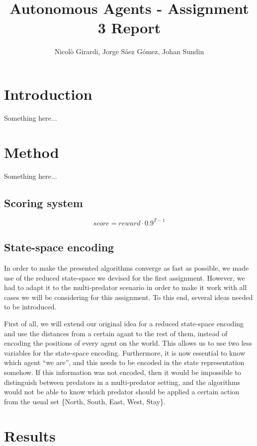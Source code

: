 \documentclass[a4paper,12pt]{article}
\title{Autonomous Agents - Assignment 3 Report}
\author{Nicolò Girardi, Jorge Sáez Gómez, Johan Sundin}
\begin{document}
\maketitle

\section{Introduction}

Something here...

\section{Method}

Something here...

\subsection{Scoring system}

$$ score = reward \cdot 0.9^{T - 1} $$

\subsection{State-space encoding}

In order to make the presented algorithms converge as fast as possible, we made use of the reduced state-space we devised for the first assignment. However, we had to adapt it to the multi-predator scenario in order to make it work with all cases we will be considering for this assignment. To this end, several ideas needed to be introduced.

First of all, we will extend our original idea for a reduced state-space encoding and use the distances from a certain agant to the rest of them, instead of encoding the positions of every agent on the world. This allows us to use two less variables for the state-space encoding. Furthermore, it is now essential to know which agent ``we are'', and this needs to be encoded in the state representation somehow. If this information was not encoded, then it would be impossible to distinguish between predators in a multi-predator setting, and the algorithms would not be able to know which predator should be applied a certain action from the usual set \{North, South, East, West, Stay\}.

\section{Results}
\end{document}
